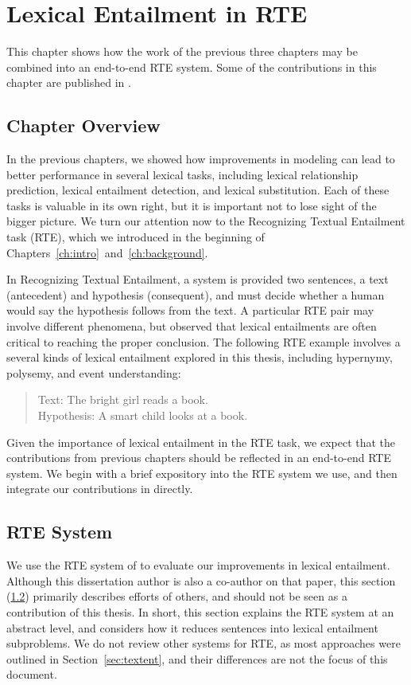 \chapter{Lexical Entailment in RTE}
\label{ch:rte}

This chapter shows how the work of the previous three chapters may be combined
into an end-to-end RTE system. Some of the contributions in this chapter are
published in .

\section{Chapter Overview}

In the previous chapters, we showed how improvements in modeling can lead
to better performance in several lexical tasks, including lexical relationship
prediction, lexical entailment detection, and lexical substitution. Each of
these tasks is valuable in its own right, but it is important not to lose
sight of the bigger picture. We turn our attention now to the Recognizing
Textual Entailment task (RTE), which we introduced in the beginning of
Chapters~\ref{ch:intro}~and~\ref{ch:background}.

In Recognizing Textual Entailment, a system is provided two sentences, a text (antecedent) and
hypothesis (consequent), and must decide whether a human would say the
hypothesis follows from the text.
A particular RTE pair may involve different phenomena, but
 observed that lexical entailments are often critical
to reaching the proper conclusion. The following RTE example
involves a several kinds of lexical entailment explored in this thesis,
including hypernymy, polysemy, and event understanding:
\begin{quote}
  Text: The bright girl reads a book.\\
  Hypothesis: A smart child looks at a book.
\end{quote}
Given the importance of lexical entailment in the RTE task, we expect that
the contributions from previous chapters should be reflected in an end-to-end
RTE system. We begin with a brief expository into the RTE system we use, and
then integrate our contributions in directly.

\section{RTE System}
\label{sec:rtesystem}

We use the RTE system of  to evaluate our improvements
in lexical entailment. Although this dissertation author is also a co-author on
that paper, this section (\ref{sec:rtesystem}) primarily describes efforts of
others, and should not be seen as a contribution of this thesis. In short,
this section explains the RTE system at an abstract level, and considers how it
reduces sentences into lexical entailment subproblems. We do not review other
systems for RTE, as most approaches were outlined in
Section~\ref{sec:textent}, and their differences are not the focus of this
document.

